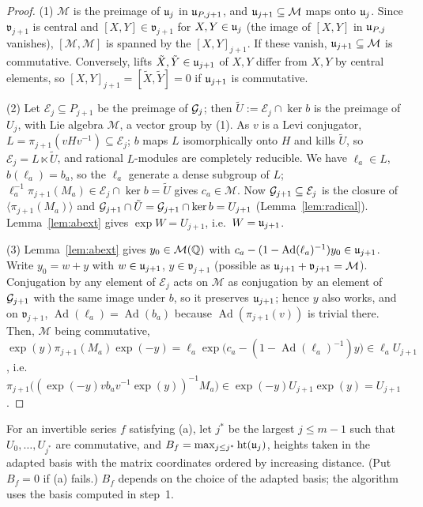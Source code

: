 \begin{proof}
(1) $\mathcal M$ is the preimage of $\mathfrak{u}_j$ in $\mathfrak{u}_{P,j+1}$, and $\mathfrak{u}_{j+1}\subseteq\mathcal M$ maps onto
$\mathfrak{u}_j$. Since $\mathfrak v_{j+1}$ is central and $[X,Y]\in\mathfrak v_{j+1}$ for $X,Y\in\mathfrak{u}_j$ (the
image of $[X,Y]$ in $\mathfrak{u}_{P,j}$ vanishes), $[\mathcal M,\mathcal M]$ is spanned by the $[X,Y]_{j+1}$. If
these vanish, $\mathfrak{u}_{j+1}\subseteq\mathcal M$ is commutative. Conversely, lifts $\tilde X,\tilde Y\in\mathfrak{u}_{j+1}$
of $X,Y$ differ from $X,Y$ by central elements, so $[X,Y]_{j+1}=[\tilde X,\tilde Y]=0$ if $\mathfrak{u}_{j+1}$ is
commutative.

(2) Let $\mathcal E_j\subseteq P_{j+1}$ be the preimage of $\mathcal{G}_j$; then
$\tilde U:=\mathcal E_j\cap\ker b$ is the preimage of $U_j$, with Lie algebra $\mathcal M$, a vector
group by (1). As $v$ is a Levi conjugator, $L=\pi_{j+1}(vHv^{-1})\subseteq\mathcal E_j$; $b$ maps $L$
isomorphically onto $H$ and kills $\tilde U$, so $\mathcal E_j=L\ltimes\tilde U$, and rational $L$-modules
are completely reducible. We have $\ell_a\in L$, $b(\ell_a)=b_a$, so the $\ell_a$ generate a dense
subgroup of $L$; $\ell_a^{-1}\pi_{j+1}(M_a)\in\mathcal E_j\cap\ker b=\tilde U$ gives $c_a\in\mathcal M$.
Now $\mathcal{G}_{j+1}\subseteq\mathcal E_j$ is the closure of $\langle\pi_{j+1}(M_a)\rangle$ and
$\mathcal{G}_{j+1}\cap\tilde U=\mathcal{G}_{j+1}\cap\ker b=U_{j+1}$ (Lemma~\ref{lem:radical}). Lemma~\ref{lem:abext}
gives $\exp W=U_{j+1}$, i.e.\ $W=\mathfrak{u}_{j+1}$.

(3) Lemma~\ref{lem:abext} gives $y_0\in\mathcal M(\mathbb{Q})$ with
$c_a-(1-\operatorname{Ad}(\ell_a)^{-1})y_0\in\mathfrak{u}_{j+1}$. Write $y_0=w+y$ with $w\in\mathfrak{u}_{j+1}$,
$y\in\mathfrak v_{j+1}$ (possible as $\mathfrak{u}_{j+1}+\mathfrak v_{j+1}=\mathcal M$). Conjugation by any
element of $\mathcal E_j$ acts on $\mathcal M$ as conjugation by an element of $\mathcal{G}_{j+1}$ with the same
image under $b$, so it preserves $\mathfrak{u}_{j+1}$; hence $y$ also works, and on $\mathfrak v_{j+1}$,
$\operatorname{Ad}(\ell_a)=\operatorname{Ad}(b_a)$ because $\operatorname{Ad}(\pi_{j+1}(v))$ is trivial there.
Then, $\mathcal M$ being commutative, $\exp(y)\pi_{j+1}(M_a)\exp(-y)
=\ell_a\exp\bigl(c_a-(1-\operatorname{Ad}(\ell_a)^{-1})y\bigr)\in\ell_aU_{j+1}$, i.e.\
$\pi_{j+1}\bigl((\exp(-y)vb_av^{-1}\exp(y))^{-1}M_a\bigr)\in\exp(-y)U_{j+1}\exp(y)=U_{j+1}$.
\end{proof}

\begin{definition}\label{def:heights}
For an invertible series $f$ satisfying (a), let $j^*$ be the largest $j\le m-1$ such that
$U_0,\ldots,U_{j^*}$ are commutative, and $B_f=\max_{j\le j^*}\operatorname{ht}(\mathfrak{u}_j)$, heights taken in
the adapted basis with the matrix coordinates ordered by increasing distance. (Put $B_f=0$ if (a)
fails.) $B_f$ depends on the choice of the adapted basis; the algorithm uses the basis computed in step~1.
\end{definition}

